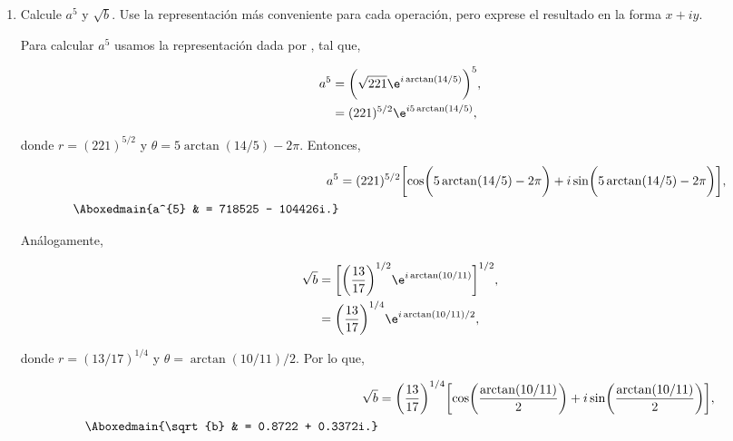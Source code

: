 \documentclass[./../main.tex]{subfiles}
\begin{document}
\begin{problema}
\begin{enumerate}
		      Tal que,

		      \begin{empheq}[box=\resultbox]{equation*}
			      b = e^{i\arctan\bigl(\bigr)}.
			      \label{eq:b-complex-polar}
		      \end{empheq}

		\item Calcule \(a^{5}\) y \(\sqrt{b}\). Use la representación más conveniente para cada operación, pero exprese el resultado en la forma \(x + iy\).

		      \startsolution

		      Para calcular \(a^{5}\) usamos la representación dada por , tal que,

		      \begin{align*}
			      a^{5} & = \biggl(\sqrt{221}\e^{i\arctan(14 / 5)}\biggr)^{5}, \\
			            & = (221)^{5 / 2}\e^{i5\arctan(14 / 5)},
		      \end{align*}

		      donde \(r = (221)^{5 / 2}\) y \(\theta = 5\arctan(14 / 5) - 2\pi\). Entonces,

		      \begin{align*}
			      a^{5}             & = (221)^{5 / 2}\biggl[\cos\biggl(5\arctan(14 / 5) - 2\pi\biggr) + i\sin\biggl(5\arctan(14 / 5) - 2\pi\biggr)\biggr], \\
			      \Aboxedmain{a^{5} & = 718525 - 104426i.}
		      \end{align*}

		      Análogamente,

		      \begin{align*}
			      \sqrt{b} & = \biggl[\biggl(\dfrac{13}{17}\biggr)^{1 / 2}\e^{i\arctan(10 / 11)}\biggr]^{1 / 2}, \\
			               & = \bigg(\dfrac{13}{17}\bigg)^{1 / 4}\e^{i\arctan(10 / 11) / 2},                     \\
		      \end{align*}

		      donde \(r = (13 / 17)^{1 / 4}\) y \(\theta = \arctan(10 / 11) / 2\). Por lo que,

		      \begin{align*}
			      \sqrt{b}             & = \bigg(\dfrac{13}{17}\bigg)^{1 / 4}\biggl[\cos\biggl(\dfrac{\arctan(10 / 11)}{2}\biggr) + i\sin\biggl(\dfrac{\arctan(10 / 11)}{2}\biggr)\biggr], \\
			      \Aboxedmain{\sqrt{b} & = 0.8722 + 0.3372i.}
		      \end{align*}
	\end{enumerate}
\end{problema}
\end{document}

